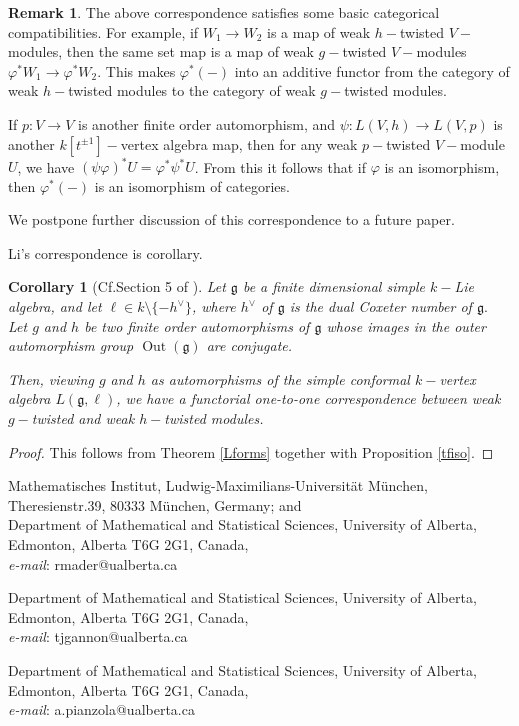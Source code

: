 \documentclass{article}
\newtheorem{cor}[thm]{Corollary}
\theoremstyle{definition}
\newtheorem{rem}[thm]{Remark}
\def\Out{\ensuremath{\operatorname{Out}}}
\def\fg{\ensuremath{\mathfrak{g}}}
\begin{document}
\begin{rem}
    The above correspondence satisfies some basic categorical compatibilities. 
    For example, if $W_1 \to W_2$ is a map of weak $h-$twisted $V-$modules, then the same set map is a map of weak $g-$twisted $V-$modules $\varphi^\ast W_1 \to \varphi^\ast W_2$. 
    This makes $\varphi^\ast(-)$ into an additive functor from the category of weak $h-$twisted modules to the category of weak $g-$twisted modules.

    If $p \colon V \to V$ is another finite order automorphism, and $\psi \colon L(V,h) \to L(V,p)$ is another $k[t^{\pm 1}]-$vertex algebra map, then for any weak $p-$twisted $V-$module $U$, we have $(\psi \varphi)^\ast U = \varphi^\ast \psi^\ast U$.
    From this it follows that if $\varphi$ is an isomorphism, then $\varphi^\ast (-)$ is an isomorphism of categories.

	We  postpone further discussion of this correspondence to a future paper.
\end{rem}

\noindent Li's correspondence is corollary.

\begin{cor}[Cf.\@ Section 5 of \cite{Li1}]
    Let $\mathfrak g$ be a finite dimensional simple $k-$Lie algebra, and let $\ell \in k \setminus \{ -h^\vee\}$, where $h^\vee$ of $\fg$ is the dual Coxeter number of $\fg.$
    Let $g$ and $h$ be two finite order automorphisms of $\mathfrak g$ whose images in the outer automorphism group $\Out(\fg)$ are conjugate.

    Then, viewing $g$ and $h$ as automorphisms of the simple conformal $k-$vertex algebra $L(\fg, \ell)$, we have a functorial one-to-one correspondence between weak $g-$twisted and weak $h-$twisted modules.
\end{cor}

\begin{proof}
    This follows from Theorem \ref{Lforms} together with Proposition \ref{tfiso}.
\end{proof}




\small{	\noindent Mathematisches Institut, Ludwig-Maximilians-Universität München, Theresienstr.\@ 39, 80333 München, Germany; and \\ 
Department of Mathematical and Statistical Sciences, University of Alberta, Edmonton, Alberta T6G 2G1, Canada, \\
\textit{e-mail}: \textsf{rmader@ualberta.ca}

\medskip
\noindent Department of Mathematical and Statistical Sciences, University of Alberta, Edmonton, Alberta T6G 2G1, Canada, \\
\textit{e-mail}: \textsf{tjgannon@ualberta.ca}

\medskip
\noindent Department of Mathematical and Statistical Sciences, University of Alberta, Edmonton, Alberta T6G 2G1, Canada, \\
\textit{e-mail}: \textsf{a.pianzola@ualberta.ca}
}

\end{document}
